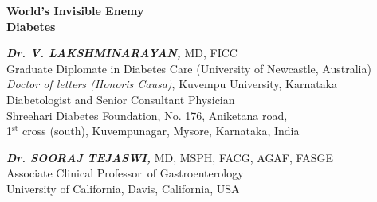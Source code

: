 \thispagestyle{empty}

\begin{center}
\Huge\textbf{World’s Invisible Enemy\\ Diabetes}
\end{center}

\vskip 150pt


\begin{center}
{\large\textbf{\textit{Dr. V. LAKSHMINARAYAN,}} MD, FICC\\{\small Graduate Diplomate in Diabetes Care (University of Newcastle, Australia)\\\textit{Doctor of letters (Honoris Causa)}, Kuvempu University, Karnataka\\ Diabetologist and Senior Consultant Physician\\ Shreehari Diabetes Foundation, No. 176, Aniketana road,\\ 1$^{\text{st}}$ cross (south), Kuvempunagar, Mysore, Karnataka, India}}
\end{center}

\vskip 30pt

\begin{center}
{\large\textbf{\textit{Dr. SOORAJ TEJASWI,}} MD, MSPH, FACG, AGAF, FASGE\\{\small Associate Clinical Professor of Gastroenterology\\ University of California, Davis, California, USA}}
\end{center}
